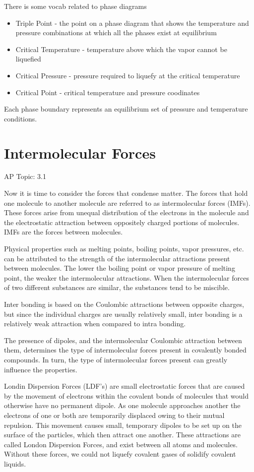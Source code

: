 \documentclass[../chem.tex]{subfiles}
\begin{document}
There is some vocab related to phase diagrams 
\begin{itemize}
    \item Triple Point - the point on a phase diagram that shows the temperature and pressure combinations at which all the phases exist at equilibrium 
    \item Critical Temperature - temperature above which the vapor cannot be liquefied 
    \item Critical Pressure - pressure required to liquefy at the critical temperature 
    \item Critical Point - critical temperature and pressure coodinates
\end{itemize}

Each phase boundary represents an equilibrium set of pressure and temperature conditions.
\section{Intermolecular Forces}
AP Topic: 3.1

Now it is time to consider the forces that condense matter. The forces that hold one molecule to another molecule are referred to as intermolecular forces (IMFs).
These forces arise from unequal distribution of the electrons in the molecule and the electrostatic attraction between oppositely charged 
portions of molecules. IMFs are the forces between molecules.

Physical properties such as melting points, boiling points, vapor pressures, etc. can be attributed to the strength of the intermolecular attractions present between molecules. 
The lower the boiling point or vapor pressure of melting point, the weaker the intermolecular attractions. When the intermolecular forces of two different substances are similar, 
the substances tend to be miscible.

Inter bonding is based on the Coulombic attractions between opposite charges, but since the individual charges are usually relatively small, 
inter bonding is a relatively weak attraction when compared to intra bonding.

The presence of dipoles, and the intermolecular Coulombic attraction between them, determines the type of intermolecular forces present 
in covalently bonded compounds. In turn, the type of intermolecular forces present can greatly influence the properties. 

Londin Dispersion Forces (LDF's) are small electrostatic forces that are caused by the movement of electrons within the covalent bonds of molecules 
that would otherwise have no permanent dipole. As one molecule approaches another the electrons of one or both are temporarily displaced owing 
to their mutual repulsion. This movement causes small, temporary dipoles to be set up on the surface of the particles, which then attract one another. 
These attractions are called London Dispersion Forces, and exist between all atoms and molecules. Without these forces, we could not liquefy covalent gases of solidify covalent liquids. 
\end{document}
